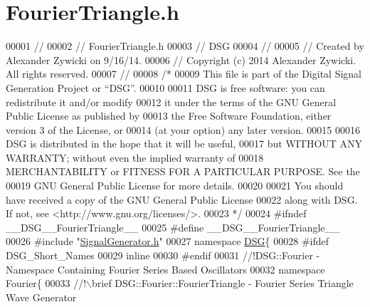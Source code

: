 \hypertarget{_fourier_triangle_8h_source}{\section{Fourier\+Triangle.\+h}
\label{_fourier_triangle_8h_source}
}

\begin{DoxyCode}
00001 \textcolor{comment}{//}
00002 \textcolor{comment}{//  FourierTriangle.h}
00003 \textcolor{comment}{//  DSG}
00004 \textcolor{comment}{//}
00005 \textcolor{comment}{//  Created by Alexander Zywicki on 9/16/14.}
00006 \textcolor{comment}{//  Copyright (c) 2014 Alexander Zywicki. All rights reserved.}
00007 \textcolor{comment}{//}
00008 \textcolor{comment}{/*}
00009 \textcolor{comment}{ This file is part of the Digital Signal Generation Project or “DSG”.}
00010 \textcolor{comment}{}
00011 \textcolor{comment}{ DSG is free software: you can redistribute it and/or modify}
00012 \textcolor{comment}{ it under the terms of the GNU General Public License as published by}
00013 \textcolor{comment}{ the Free Software Foundation, either version 3 of the License, or}
00014 \textcolor{comment}{ (at your option) any later version.}
00015 \textcolor{comment}{}
00016 \textcolor{comment}{ DSG is distributed in the hope that it will be useful,}
00017 \textcolor{comment}{ but WITHOUT ANY WARRANTY; without even the implied warranty of}
00018 \textcolor{comment}{ MERCHANTABILITY or FITNESS FOR A PARTICULAR PURPOSE.  See the}
00019 \textcolor{comment}{ GNU General Public License for more details.}
00020 \textcolor{comment}{}
00021 \textcolor{comment}{ You should have received a copy of the GNU General Public License}
00022 \textcolor{comment}{ along with DSG.  If not, see <http://www.gnu.org/licenses/>.}
00023 \textcolor{comment}{ */}
00024 \textcolor{preprocessor}{#ifndef \_\_DSG\_\_FourierTriangle\_\_}
00025 \textcolor{preprocessor}{#define \_\_DSG\_\_FourierTriangle\_\_}
00026 \textcolor{preprocessor}{#include "\hyperlink{_signal_generator_8h}{SignalGenerator.h}"}
00027 \textcolor{keyword}{namespace }\hyperlink{namespace_d_s_g}{DSG}\{
00028 \textcolor{preprocessor}{#ifdef DSG\_Short\_Names}
00029     \textcolor{keyword}{inline}
00030 \textcolor{preprocessor}{#endif}
00031 \textcolor{comment}{    //!DSG::Fourier - Namespace Containing Fourier Series Based Oscillators}
00032 \textcolor{comment}{}    \textcolor{keyword}{namespace }Fourier\{\textcolor{comment}{}
00033 \textcolor{comment}{        //!\(\backslash\)brief DSG::Fourier::FourierTriangle - Fourier Series Triangle Wave Generator}

\end{DoxyCode}
